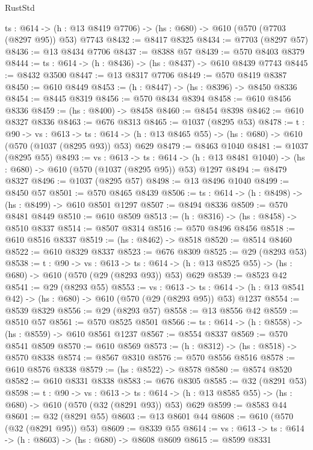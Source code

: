 \begin{lexlean}{RustStd}
\begin{coremodule}
  {ts : @614} -> (h : @13 @8419 @7706) -> (hs : @680) -> @610 (@570 (@7703 (@8297 @95)) @53) @7743
@8432 := @8417 @8325
@8434 := @7703 (@8297 @57)
@8436 := @13 @8434 @7706
@8437 := @8388 @57
@8439 := @570 @8403 @8379
@8444 := {ts : @614} -> (h : @8436) -> (hs : @8437) -> @610 @8439 @7743
@8445 := @8432 @3500
@8447 := @13 @8317 @7706
@8449 := @570 @8419 @8387
@8450 := @610 @8449
@8453 := (h : @8447) -> (hs : @8396) -> @8450 @8336
@8454 := @8445 @8319
@8456 := @570 @8434 @8394
@8458 := @610 @8456 @8336
@8459 := (hs : @8400) -> @8458
@8460 := @8454 @8398
@8462 := @610 @8327 @8336
@8463 := @676 @8313
@8465 := @1037 (@8295 @53)
@8478 := {t : @90} ->
  {vs : @613} ->
  {ts : @614} -> (h : @13 @8465 @55) -> (hs : @680) -> @610 (@570 (@1037 (@8295 @93)) @53) @629
@8479 := @8463 @1040
@8481 := @1037 (@8295 @55)
@8493 := {vs : @613} ->
  {ts : @614} -> (h : @13 @8481 @1040) -> (hs : @680) -> @610 (@570 (@1037 (@8295 @95)) @53) @1297
@8494 := @8479 @8327
@8496 := @1037 (@8295 @57)
@8498 := @13 @8496 @1040
@8499 := @8450 @57
@8501 := @570 @8465 @8439
@8506 := {ts : @614} -> (h : @8498) -> (hs : @8499) -> @610 @8501 @1297
@8507 := @8494 @8336
@8509 := @570 @8481 @8449
@8510 := @610 @8509
@8513 := (h : @8316) -> (hs : @8458) -> @8510 @8337
@8514 := @8507 @8314
@8516 := @570 @8496 @8456
@8518 := @610 @8516 @8337
@8519 := (hs : @8462) -> @8518
@8520 := @8514 @8460
@8522 := @610 @8329 @8337
@8523 := @676 @8309
@8525 := @29 (@8293 @53)
@8538 := {t : @90} ->
  {vs : @613} ->
  {ts : @614} -> (h : @13 @8525 @55) -> (hs : @680) -> @610 (@570 (@29 (@8293 @93)) @53) @629
@8539 := @8523 @42
@8541 := @29 (@8293 @55)
@8553 := {vs : @613} ->
  {ts : @614} -> (h : @13 @8541 @42) -> (hs : @680) -> @610 (@570 (@29 (@8293 @95)) @53) @1237
@8554 := @8539 @8329
@8556 := @29 (@8293 @57)
@8558 := @13 @8556 @42
@8559 := @8510 @57
@8561 := @570 @8525 @8501
@8566 := {ts : @614} -> (h : @8558) -> (hs : @8559) -> @610 @8561 @1237
@8567 := @8554 @8337
@8569 := @570 @8541 @8509
@8570 := @610 @8569
@8573 := (h : @8312) -> (hs : @8518) -> @8570 @8338
@8574 := @8567 @8310
@8576 := @570 @8556 @8516
@8578 := @610 @8576 @8338
@8579 := (hs : @8522) -> @8578
@8580 := @8574 @8520
@8582 := @610 @8331 @8338
@8583 := @676 @8305
@8585 := @32 (@8291 @53)
@8598 := {t : @90} ->
  {vs : @613} ->
  {ts : @614} -> (h : @13 @8585 @55) -> (hs : @680) -> @610 (@570 (@32 (@8291 @93)) @53) @629
@8599 := @8583 @44
@8601 := @32 (@8291 @55)
@8603 := @13 @8601 @44
@8608 := @610 (@570 (@32 (@8291 @95)) @53)
@8609 := @8339 @55
@8614 := {vs : @613} -> {ts : @614} -> (h : @8603) -> (hs : @680) -> @8608 @8609
@8615 := @8599 @8331

\end{coremodule}
\end{lexlean}

